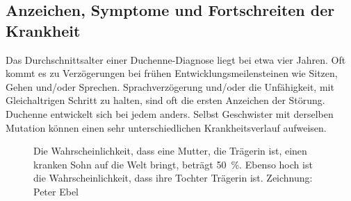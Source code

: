 \documentclass[fontsize=14pt,a4paper,headinclude,DIV=calc,automark]{scrbook}
\begin{document}
\subsection{Anzeichen, Symptome und Fortschreiten der Krankheit}

Das Durchschnittsalter einer Duchenne-Diagnose liegt bei etwa vier Jahren. Oft kommt es zu Verzögerungen bei frühen Entwicklungsmeilensteinen wie Sitzen, Gehen und/oder Sprechen. Sprachverzögerung und/oder die Unfähigkeit, mit Gleichaltrigen Schritt zu halten, sind oft die ersten Anzeichen der Störung. Duchenne entwickelt sich bei jedem anders. Selbst Geschwister mit derselben Mutation können einen sehr unterschiedlichen Krankheitsverlauf aufweisen.

\setlength{\fboxsep}{0pt}    %
\setlength{\fboxrule}{0.2pt} %
\begin{figure}[H]
    \centering
    \caption{Die Wahrscheinlichkeit, dass eine Mutter, die Trägerin ist, einen kranken Sohn auf die Welt bringt, beträgt 50~\%. Ebenso hoch ist die Wahrscheinlichkeit, dass ihre Tochter Trägerin ist. Zeichnung: Peter Ebel}
    \label{fig:vererbung}
\end{figure}
\end{document}
